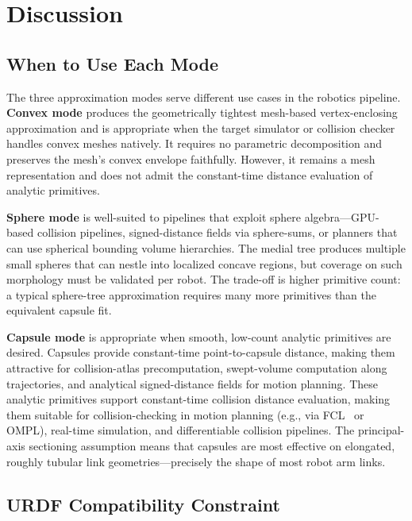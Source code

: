 \section{Discussion}
\label{sec:discussion}

\subsection{When to Use Each Mode}

The three approximation modes serve different use cases in the robotics pipeline.
\textbf{Convex mode} produces the geometrically tightest mesh-based vertex-enclosing approximation and is appropriate when the target simulator or collision checker handles convex meshes natively.
It requires no parametric decomposition and preserves the mesh's convex envelope faithfully.
However, it remains a mesh representation and does not admit the constant-time distance evaluation of analytic primitives.

\textbf{Sphere mode} is well-suited to pipelines that exploit sphere algebra---GPU-based collision pipelines, signed-distance fields via sphere-sums, or planners that can use spherical bounding volume hierarchies.
The medial tree produces multiple small spheres that can nestle into localized concave regions, but coverage on such morphology must be validated per robot.
The trade-off is higher primitive count: a typical sphere-tree approximation requires many more primitives than the equivalent capsule fit.

\textbf{Capsule mode} is appropriate when smooth, low-count analytic primitives are desired.
Capsules provide constant-time point-to-capsule distance, making them attractive for collision-atlas precomputation, swept-volume computation along trajectories, and analytical signed-distance fields for motion planning.
These analytic primitives support constant-time collision distance evaluation, making them suitable for collision-checking in motion planning (e.g., via FCL~\cite{pan2012fcl} or OMPL), real-time simulation, and differentiable collision pipelines.
The principal-axis sectioning assumption means that capsules are most effective on elongated, roughly tubular link geometries---precisely the shape of most robot arm links.

\subsection{URDF Compatibility Constraint}

